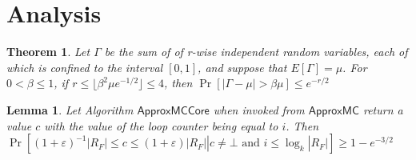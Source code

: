 \documentclass{article}
\begin{document}
\section{Analysis}
\newtheorem{A}{Theorem}
\begin{A}
	Let $\Gamma$ be the sum of of r-wise independent random variables, each of
	which is conﬁned to the interval $[0,1]$, and suppose that $E[\Gamma] = \mu$. For $0 < \beta 
	\leq 1$, if $r \leq \lfloor \beta^2 \mu e^{-1/2} \rfloor \leq 4$, then $\Pr[|\Gamma - \mu| > \beta \mu] \leq e^{-r/2} $

\end{A}
\newtheorem{B}{Lemma}
\begin{B}
	Let Algorithm $\mathsf{ApproxMCCore}$ when invoked from $\mathsf{ApproxMC}$ return a value $c$ with the value of the loop counter
	being equal to $i$. Then $\Pr[(1 + \varepsilon)^{-1}|R_F| \leq c \leq (1 + \varepsilon)|R_F| | c \neq \bot \text{ and } i \leq \log_k |R_F| ] \geq 1 - e^{-3/2}$\\ 
\end{B}
\end{document}
